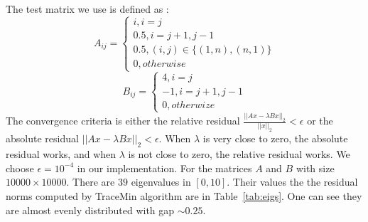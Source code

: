 \label{sec:results}

The test matrix we use is defined as :
\[
A_{ij} =
\begin{cases}
i, i =j \\
0.5, i = j+1, j-1 \\
0.5, (i, j) \in \{(1, n), (n,1)\} \\
0, otherwise
\end{cases}
\]
\[
B_{ij} = 
\begin{cases}
4, i = j \\
-1, i = j+1, j-1 \\
0, otherwize
\end{cases}
\]
The convergence criteria is either the relative residual $\frac{||Ax-\lambda B x||_2}{||x||_2} < \epsilon$ or the absolute residual $||Ax-\lambda B x||_2 < \epsilon$. When $\lambda$ is very close to zero, the absolute residual works, and when $\lambda$ is not close to zero, the relative residual works. We choose $\epsilon = 10^{-4}$ in our implementation. For the matrices $A$ and $B$ with size $10000 \times 10000$. There are $39$ eigenvalues in $[0, 10]$. Their values the the residual norms computed by TraceMin algorithm are in Table~\ref{tab:eigs}. One can see they are almost evenly distributed with gap $\sim 0.25$. 

